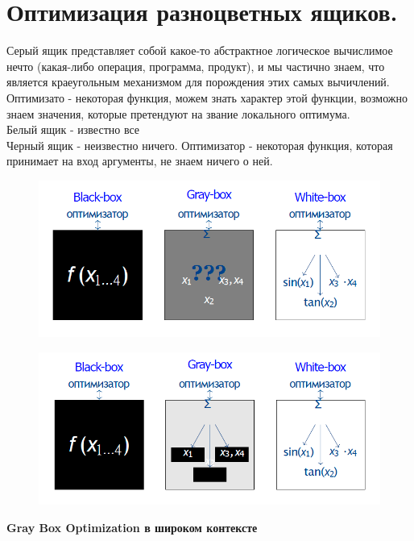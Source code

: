 \section{Оптимизация разноцветных ящиков.}
Серый ящик представляет собой какое-то абстрактное логическое вычислимое нечто (какая-либо операция, программа, продукт), и мы частично знаем, что является краеугольным механизмом для порождения этих самых вычичлений. Оптимизато - некоторая функция, можем знать характер этой функции, возможно знаем значения, которые претендуют на звание локального оптимума.\\
Белый ящик - известно все\\
Черный ящик - неизвестно ничего. Оптимизатор - некоторая функция, которая принимает на вход аргументы, не знаем ничего о ней.\\
\begin{figure}[h]
\centering
\includegraphics[width=0.8\linewidth]{images/colorbox.PNG}
\end{figure}
\begin{figure}[h]
\centering
\includegraphics[width=0.8\linewidth]{images/colorbox2.PNG}
\end{figure}
\textbf{Gray Box Optimization в широком контексте}
